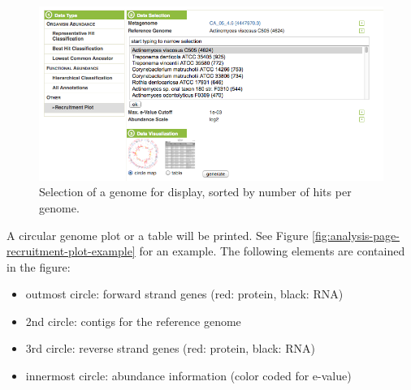 \documentclass[12pt,fullpage]{report}
\begin{document}
\begin{figure}
\begin{center}
\includegraphics[width=6in]{Images/analysis-page-recruitment-plot-genome-selection.png}
\end{center}
\caption{
Selection of a genome for display, sorted by number of hits per genome.
}
\label{fig:analysis-page-recruitment-plot-genome-selection}
\end{figure}

A circular genome plot or a table will be printed. See Figure \ref{fig:analysis-page-recruitment-plot-example}
for an example. The following elements are contained in the figure:

\begin{itemize}
\item outmost circle: forward strand genes (red: protein, black: RNA)
\item 2nd circle: contigs for the reference genome
\item 3rd circle: reverse strand genes (red: protein, black: RNA)
\item innermost circle: abundance information (color coded for e-value)
\end{itemize}
\end{document}

